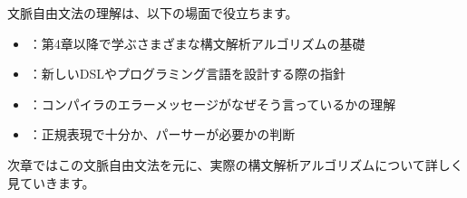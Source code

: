 文脈自由文法の理解は、以下の場面で役立ちます。

\begin{itemize}
\item
  ：第4章以降で学ぶさまざまな構文解析アルゴリズムの基礎
\item
  ：新しいDSLやプログラミング言語を設計する際の指針
\item
  ：コンパイラのエラーメッセージがなぜそう言っているかの理解
\item
  ：正規表現で十分か、パーサーが必要かの判断
\end{itemize}

次章ではこの文脈自由文法を元に、実際の構文解析アルゴリズムについて詳しく見ていきます。
